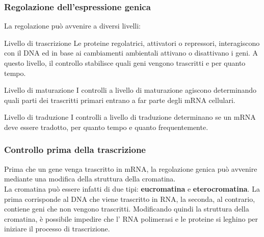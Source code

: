 \documentclass[hyperref={pdfpagelabels=false}]{beamer}
\begin{document}
\begin{frame}\frametitle{Regolazione dell'espressione genica}
La regolazione pu\`o avvenire a diversi livelli:
\begin{block}{Livello di trascrizione}
Le proteine regolatrici, attivatori o repressori, interagiscono con il DNA ed in base ai cambiamenti ambientali attivano o disattivano i geni. A questo livello, il controllo stabilisce quali geni vengono trascritti e per quanto tempo.
\end{block}
\begin{block}{Livello di maturazione}
I controlli a livello di maturazione agiscono determinando quali parti dei trascritti primari entrano a far parte degli mRNA cellulari.
\end{block}
\begin{block}{Livello di traduzione}
I controlli a livello di traduzione determinano se un mRNA deve essere tradotto, per quanto tempo e quanto frequentemente.
\end{block}
\end{frame}


\begin{frame}\frametitle{Controllo prima della trascrizione}
 Prima che un gene venga trascritto in mRNA, la regolazione genica pu\`o avvenire mediante una modifica della struttura della cromatina.\\
 La cromatina pu\`o essere infatti di due tipi: \textbf{eucromatina} e \textbf{eterocromatina}. La prima corrisponde al DNA che viene trascritto in RNA, la seconda, al contrario, contiene geni che non vengono trascritti.
 Modificando quindi la struttura della cromatina, \`e possibile impedire che l' RNA polimerasi e le proteine si leghino per iniziare il processo di trascrizione.
\end{frame}
\end{document}
